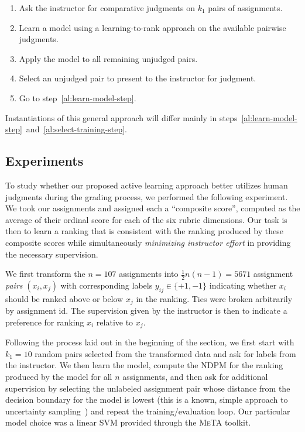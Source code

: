 \begin{enumerate}
  \item Ask the instructor for comparative judgments on $k_1$ pairs of
    assignments.

  \item Learn a model using a learning-to-rank approach on the available
    pairwise judgments.\label{al:learn-model-step}

  \item Apply the model to all remaining unjudged pairs.

  \item Select an unjudged pair to present to the instructor for
    judgment.\label{al:select-training-step}

  \item Go to step~\ref{al:learn-model-step}.
\end{enumerate}
Instantiations of this general approach will differ mainly in
steps~\ref{al:learn-model-step}~and~\ref{al:select-training-step}.

\subsection{Experiments}

To study whether our proposed active learning approach better utilizes
human judgments during the grading process, we performed the following
experiment. We took our assignments and assigned each a ``composite
score'', computed as the average of their ordinal score for each of the six
rubric dimensions. Our task is then to learn a ranking that is consistent
with the ranking produced by these composite scores while simultaneously
\emph{minimizing instructor effort} in providing the necessary supervision.

We first transform the $n = 107$ assignments into $\frac{1}{2}n(n-1) =
5671$ assignment \emph{pairs} $(x_i, x_j)$ with corresponding labels
$y_{ij} \in \{+1, -1\}$ indicating whether $x_i$ should be ranked above or
below $x_j$ in the ranking. Ties were broken arbitrarily by assignment id.
The supervision given by the instructor is then to indicate a preference
for ranking $x_i$ relative to $x_j$.

Following the process laid out in the beginning of the section, we first
start with $k_1 = 10$ random pairs selected from the transformed data and
ask for labels from the instructor. We then learn the model, compute the
NDPM for the ranking produced by the model for all $n$ assignments, and
then ask for additional supervision by selecting the unlabeled assignment
pair whose distance from the decision boundary for the model is lowest
(this is a known, simple approach to uncertainty
sampling~\cite{Settles:2012}) and repeat the training/evaluation loop. Our
particular model choice was a linear SVM provided through the \textsc{MeTA}
toolkit.

